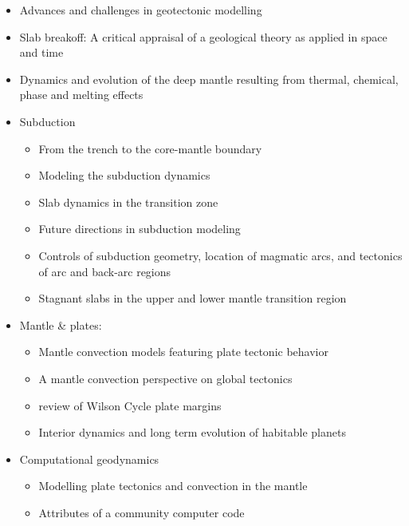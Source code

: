 \begin{itemize}
\item Advances and challenges in geotectonic modelling \cite{bufy14}
\item Slab breakoff: A critical appraisal of a geological theory as applied in space and time \cite{garm18}
\item Dynamics and evolution of the deep mantle resulting from thermal, chemical, phase and melting effects \cite{tack12}

\item Subduction
   \begin{itemize}
   \item From the trench to the core-mantle boundary \cite{kinc95}
   \item Modeling the subduction dynamics \cite{bill08}
   \item Slab dynamics in the transition zone \cite{bill10}
   \item Future directions in subduction modeling \cite{gery11}
   \item Controls of subduction geometry, location of magmatic arcs, 
         and tectonics of arc and back-arc regions \cite{crpi82}
   \item Stagnant slabs in the upper and lower mantle transition region \cite{fuwo01}
   \end{itemize}

\item Mantle \& plates:
   \begin{itemize}
   \item Mantle convection models featuring plate tectonic behavior \cite{lowm11}
   \item A mantle convection perspective on global tectonics \cite{cogu17}
   \item review of Wilson Cycle plate margins \cite{buto14}
   \item Interior dynamics and long term evolution of habitable planets \cite{taab12}
   \end{itemize}

\item Computational geodynamics
   \begin{itemize}
   \item Modelling plate tectonics and convection in the mantle \cite{mogz00}
   \item Attributes of a community computer code \cite{comc15}
   \end{itemize}


\end{itemize}
